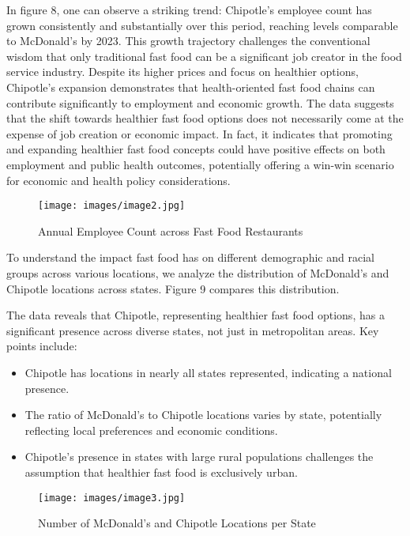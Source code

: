 \documentclass[letterpaper, 11pt]{report}
\begin{document}
In figure 8, one can observe a striking trend: Chipotle's employee count has grown consistently and substantially over this period, reaching levels comparable to McDonald's by 2023. This growth trajectory challenges the conventional wisdom that only traditional fast food can be a significant job creator in the food service industry. Despite its higher prices and focus on healthier options, Chipotle's expansion demonstrates that health-oriented fast food chains can contribute significantly to employment and economic growth. The data suggests that the shift towards healthier fast food options does not necessarily come at the expense of job creation or economic impact. In fact, it indicates that promoting and expanding healthier fast food concepts could have positive effects on both employment and public health outcomes, potentially offering a win-win scenario for economic and health policy considerations. \cite{chipotle2024_locations}

\begin{figure}[h!]
    \centering
    \texttt{[image: images/image2.jpg]}
    \caption{Annual Employee Count across Fast Food Restaurants}
    \label{fig:employees}
\end{figure}

To understand the impact fast food has on different demographic and racial groups across various locations, we analyze the distribution of McDonald's and Chipotle locations across states. Figure 9 compares this distribution. \cite{csun2024_mcd}

The data reveals that Chipotle, representing healthier fast food options, has a significant presence across diverse states, not just in metropolitan areas. Key points include:

\begin{itemize}
    \item Chipotle has locations in nearly all states represented, indicating a national presence.
    \item The ratio of McDonald's to Chipotle locations varies by state, potentially reflecting local preferences and economic conditions.
    \item Chipotle's presence in states with large rural populations challenges the assumption that healthier fast food is exclusively urban.
\end{itemize}

\begin{figure}[h!]
    \centering
    \texttt{[image: images/image3.jpg]}
    \caption{Number of McDonald's and Chipotle Locations per State}
    \label{fig:employees}
\end{figure}
\end{document}
